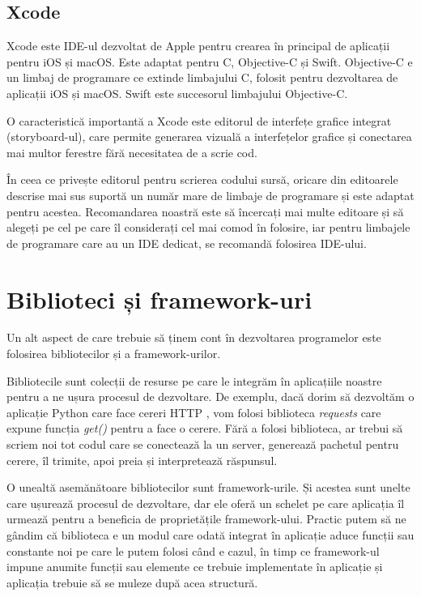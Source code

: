 \subsection{Xcode}
\label{sec:appdev-ide-xcode}

Xcode este IDE-ul dezvoltat de Apple pentru crearea în principal de aplicații
pentru iOS și macOS. Este adaptat pentru C, Objective-C și Swift. Objective-C e
un limbaj de programare ce extinde limbajului C, folosit pentru dezvoltarea de
aplicații iOS și macOS. Swift este succesorul limbajului Objective-C.

O caracteristică importantă a Xcode este editorul de interfețe grafice integrat
(storyboard-ul), care permite generarea vizuală a interfețelor grafice și
conectarea mai multor ferestre fără necesitatea de a scrie cod.

În ceea ce privește editorul pentru scrierea codului sursă, oricare din
editoarele descrise mai sus suportă un număr mare de limbaje de programare și
este adaptat pentru acestea. Recomandarea noastră este să încercați mai multe
editoare și să alegeți pe cel pe care îl considerați cel mai comod în folosire,
iar pentru limbajele de programare care au un IDE dedicat, se recomandă
folosirea IDE-ului.

\section{Biblioteci și framework-uri}
\label{sec:appdev-libs}

Un alt aspect de care trebuie să ținem cont în dezvoltarea programelor este
folosirea bibliotecilor și a framework-urilor.

Bibliotecile sunt colecții de resurse pe care le integrăm în aplicațiile noastre
pentru a ne ușura procesul de dezvoltare. De exemplu, dacă dorim să dezvoltăm o
aplicație Python care face cereri HTTP , vom folosi biblioteca \textit{requests} care expune funcția
\textit{get()} pentru a face o cerere. Fără a folosi biblioteca, ar trebui să
scriem noi tot codul care se conectează la un server, generează pachetul pentru
cerere, îl trimite, apoi preia și interpretează răspunsul.

O unealtă asemănătoare bibliotecilor sunt framework-urile. Și acestea sunt
unelte care ușurează procesul de dezvoltare, dar ele oferă un schelet pe care
aplicația îl urmează pentru a beneficia de proprietățile framework-ului. Practic
putem să ne gândim că biblioteca e un modul care odată integrat în aplicație
aduce funcții sau constante noi pe care le putem folosi când e cazul, în timp ce
framework-ul impune anumite funcții sau elemente ce trebuie implementate în
aplicație și aplicația trebuie să se muleze după acea structură.

